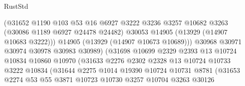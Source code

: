 \begin{lexlean}{RustStd}
\begin{coremodule}
                                    (@31652
                                      @1190
                                      @103
                                      @53
                                      @16
                                      @6927
                                      @3222
                                      @3236
                                      @3257
                                      @10682
                                      @3263
                                      (@30086 @1189 @6927 @24478 @24482)
                                      @30053
                                      @14905
                                      (@13929 (@14907 @10683 @3222)))
                                    @14905
                                    (@13929 (@14907 @10673 @10689)))
                                  @30968
                                  @30971
                                  @30974
                                  @30978
                                  @30983
                                  @30989)
                                (@31698
                                  @10699
                                  @2329
                                  @2393
                                  @13
                                  @10724
                                  @10834
                                  @10860
                                  @10970
                                  (@31633
                                    @2276
                                    @2302
                                    @2328
                                    @13
                                    @10724
                                    @10733
                                    @3222
                                    @10834
                                    (@31644
                                      @2275
                                      @1014
                                      @19390
                                      @10724
                                      @10731
                                      @8781
                                      (@31653
                                        @2274
                                        @53
                                        @55
                                        @3871
                                        @10723
                                        @10730
                                        @3257
                                        @10704
                                        @3263
                                        @30126

\end{coremodule}
\end{lexlean}
